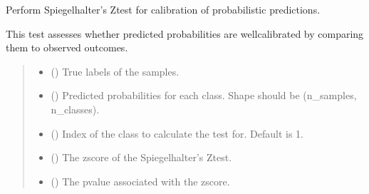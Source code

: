 \documentclass[letterpaper,10pt,english]{sphinxmanual}
\begin{document}
\begin{fulllineitems}
\label{\detokenize{calzone:calzone.metrics.spiegelhalter_z_test}}
\pysigstartsignatures
{}
\pysigstopsignatures
\sphinxAtStartPar
Perform Spiegelhalter’s Z\sphinxhyphen{}test for calibration of probabilistic predictions.

\sphinxAtStartPar
This test assesses whether predicted probabilities are well\sphinxhyphen{}calibrated by comparing
them to observed outcomes.
\begin{quote}\begin{description}
\begin{itemize}
\item {} 
\sphinxAtStartPar
{} () \textendash{} True labels of the samples.

\item {} 
\sphinxAtStartPar
{} () \textendash{} Predicted probabilities for each class. Shape should be (n\_samples, n\_classes).

\item {} 
\sphinxAtStartPar
{} () \textendash{} Index of the class to calculate the test for. Default is 1.

\end{itemize}

\begin{itemize}
\item {} 
\sphinxAtStartPar
{} () \textendash{} The z\sphinxhyphen{}score of the Spiegelhalter’s Z\sphinxhyphen{}test.

\item {} 
\sphinxAtStartPar
{} () \textendash{} The p\sphinxhyphen{}value associated with the z\sphinxhyphen{}score.

\end{itemize}


\end{description}
\end{quote}
\end{fulllineitems}
\end{document}

